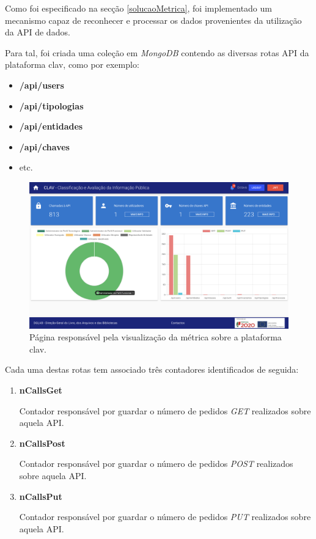 Como foi especificado na secção \ref{solucaoMetrica}, foi implementado um mecanismo capaz de reconhecer e processar os dados provenientes da utilização da API de dados.

Para tal, foi criada uma coleção em \emph{MongoDB} contendo as diversas rotas API da plataforma \gls{clav}, como por exemplo:

\begin{itemize}
    \item \textbf{/api/users}
    \item \textbf{/api/tipologias}
    \item \textbf{/api/entidades}
    \item \textbf{/api/chaves}
    \item etc.
\end{itemize}

\begin{figure}[H]
    \centering
    \includegraphics[width=\textwidth]{img/clav/metrica/metrica.png}
    \caption{Página responsável pela visualização da métrica sobre a plataforma \gls{clav}.}
    \label{fig:metricaCLAV}
\end{figure}

Cada uma destas rotas tem associado três contadores identificados de seguida:

\begin{enumerate}
    \item \textbf{nCallsGet}
    
    Contador responsável por guardar o número de pedidos \emph{GET} realizados sobre aquela API.
    
    \item \textbf{nCallsPost}
    
    Contador responsável por guardar o número de pedidos \emph{POST} realizados sobre aquela API.
    
    \item \textbf{nCallsPut}
    
    Contador responsável por guardar o número de pedidos \emph{PUT} realizados sobre aquela API.
\end{enumerate}

